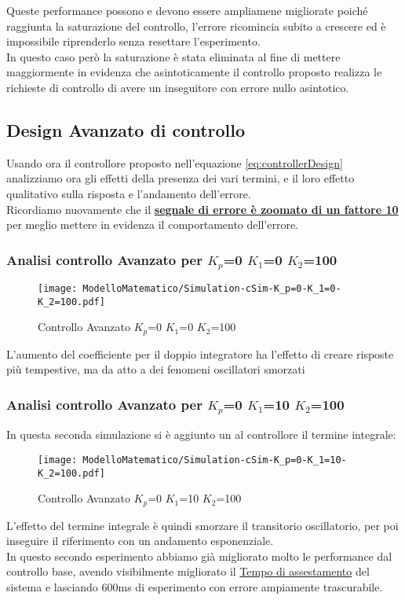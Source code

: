 \noindent
Queste performance possono e devono essere ampliamene migliorate poiché raggiunta la saturazione del controllo, l'errore ricomincia subito a crescere ed è impossibile riprenderlo senza resettare l'esperimento.\\
In questo caso però la saturazione è stata eliminata al fine di mettere maggiormente in evidenza che asintoticamente il controllo proposto realizza le richieste di controllo di avere un inseguitore con errore nullo asintotico.

\newpage
\subsection{Design Avanzato di controllo}
Usando ora il controllore proposto nell'equazione \ref{eq:controllerDesign} analizziamo ora gli effetti della presenza dei vari termini, e il loro effetto qualitativo sulla risposta e l'andamento dell'errore.\\
Ricordiamo nuovamente che il {\color{red}\textbf{\underline{segnale di errore è zoomato di un fattore 10}}} per meglio mettere in evidenza il comportamento dell'errore.

\subsubsection{Analisi controllo Avanzato per $ K_p $=0 $ K_1 $=0 $ K_2 $=100}
\begin{figure}[H]
	\centering
	\caption[Controllo Avanzato $ K_p $=0 $ K_1 $=0 $ K_2 $=100] {Controllo Avanzato $ K_p $=0 $ K_1 $=0 $ K_2 $=100}
	\texttt{[image: ModelloMatematico/Simulation-cSim-K\_p=0-K\_1=0-K\_2=100.pdf]}
\end{figure}
\noindent
L'aumento del coefficiente per il doppio integratore ha l'effetto di creare risposte più tempestive, ma da atto a dei fenomeni oscillatori smorzati

\subsubsection{Analisi controllo Avanzato per $ K_p $=0 $ K_1 $=10 $ K_2 $=100}
In questa seconda simulazione si è aggiunto un al controllore il termine integrale:
\begin{figure}[H]
	\centering
	\caption[Controllo Avanzato $ K_p $=0 $ K_1 $=10 $ K_2 $=100]{Controllo Avanzato $ K_p $=0 $ K_1 $=10 $ K_2 $=100}
	\texttt{[image: ModelloMatematico/Simulation-cSim-K\_p=0-K\_1=10-K\_2=100.pdf]}
\end{figure}
\noindent
L'effetto del termine integrale è quindi smorzare il transitorio oscillatorio, per poi inseguire il riferimento con un andamento esponenziale.\\
In questo secondo esperimento abbiamo già migliorato molto le performance dal controllo base, avendo visibilmente migliorato il \underline{Tempo di assestamento} del sistema e lasciando 600ms di esperimento con errore ampiamente trascurabile.
\newpage
